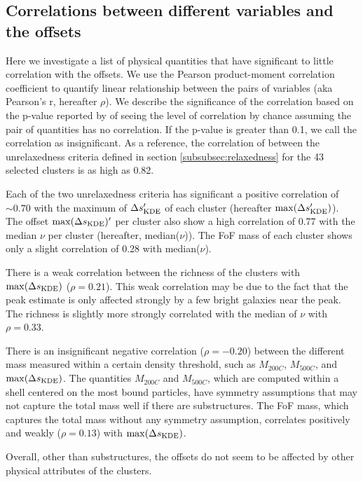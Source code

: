 \subsection{Correlations between different variables and the offsets}

Here we investigate a list of physical quantities that have significant to little
correlation with the offsets. 
We use the Pearson product-moment correlation coefficient to quantify linear 
relationship between the pairs of variables
(aka Pearson's r,  hereafter $\rho$).
We describe the significance of the correlation 
based on the p-value reported by {} of seeing the level of 
correlation by chance assuming the pair of 
quantities has no correlation. If the p-value is greater than 0.1, we call the
correlation as insignificant.
As a reference, the correlation of between the 
unrelaxedness criteria defined in section \ref{subsubsec:relaxedness}
for the 43 selected clusters is as high as 0.82. 

Each of the two unrelaxedness criteria has significant a positive correlation of $\sim 0.70$
with the maximum of $\Delta s_{\rm KDE}'$ of each cluster
(hereafter $\max(\Delta s_{\rm KDE}')$).
The offset $\max(\Delta s_{\rm KDE})'$ per cluster also show a high
correlation of 0.77 with the median $\nu$ per cluster (hereafter,
median($\nu$)). The FoF mass of each cluster shows only a slight correlation of 0.28 with 
 median($\nu$).

There is a weak correlation between the richness of the
clusters with $\max(\Delta s_{\rm KDE})$ ($\rho = 0.21$). This weak correlation 
may be due to 
the fact that the peak estimate is only affected strongly by a few bright galaxies near 
the peak. The richness is slightly more strongly correlated with the median of $\nu$ 
with $\rho = 0.33$. 

There is an insignificant negative correlation ($\rho = -0.20$) between the different mass 
measured within a certain density threshold, such as $M_{200C}$, $M_{500C}$, 
and $\max(\Delta s_{\rm KDE})$. The quantities $M_{200C}$ and $M_{500C}$, which
are computed within a shell centered on the most bound particles, have
symmetry assumptions that may not capture the total mass well if there are substructures. 
The FoF mass, which
captures the total mass without any symmetry assumption, correlates positively
and weakly 
($\rho = 0.13$) with $\max(\Delta s_{\rm KDE})$. 

Overall, other than substructures, the offsets do not seem to be affected by
other physical attributes of the clusters.


